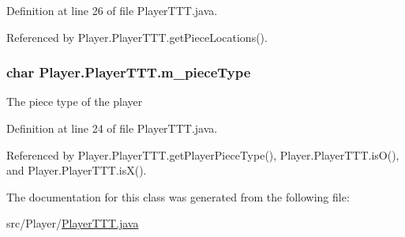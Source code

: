 Definition at line 26 of file Player\+T\+T\+T.\+java.



Referenced by Player.\+Player\+T\+T\+T.\+get\+Piece\+Locations().

\hypertarget{class_player_1_1_player_t_t_t_a2fa13b6b056d666ea9943ca84862ec69}{}
\subsubsection[{m\+\_\+piece\+Type}]{\setlength{\rightskip}{0pt plus 5cm}char Player.\+Player\+T\+T\+T.\+m\+\_\+piece\+Type\hspace{0.3cm}{\ttfamily [private]}}\label{class_player_1_1_player_t_t_t_a2fa13b6b056d666ea9943ca84862ec69}
The piece type of the player 

Definition at line 24 of file Player\+T\+T\+T.\+java.



Referenced by Player.\+Player\+T\+T\+T.\+get\+Player\+Piece\+Type(), Player.\+Player\+T\+T\+T.\+is\+O(), and Player.\+Player\+T\+T\+T.\+is\+X().



The documentation for this class was generated from the following file\+:\begin{DoxyCompactItemize}
\item 
src/\+Player/\hyperlink{_player_t_t_t_8java}{Player\+T\+T\+T.\+java}\end{DoxyCompactItemize}
